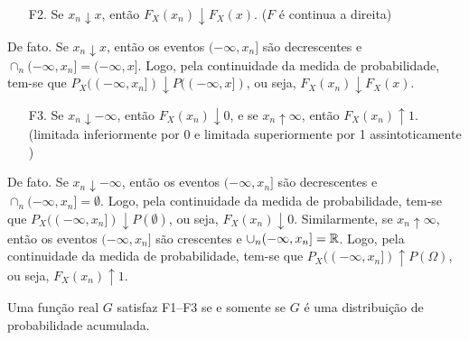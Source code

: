 \begin{frame}
\begin{block}{}

\begin{enumerate}
\item[F2.] Se $x_n\downarrow x$, então $F_X(x_n)\downarrow F_X(x)$. ($F$ é continua a direita)
\end{enumerate}
De fato. Se $x_n\downarrow x$, então os eventos $(-\infty, x_n]$ são
decrescentes e $\cap_n(-\infty, x_n]=(-\infty, x]$. Logo, pela
continuidade da medida de probabilidade, tem-se que $P_X((-\infty,
x_n])\downarrow P((-\infty, x])$, ou seja, $F_X(x_n)\downarrow
F_X(x)$.
\end{block}

\begin{block}{}

\begin{enumerate}
\item[F3.] Se $x_n\downarrow -\infty$, então $F_X(x_n)\downarrow 0$, e se $x_n\uparrow \infty$, então $F_X(x_n)\uparrow 1$. (limitada inferiormente por 0 e limitada superiormente por 1 assintoticamente )
\end{enumerate}
De fato. Se $x_n\downarrow -\infty$, então os eventos $(-\infty, x_n]$ são
decrescentes e $\cap_n (-\infty, x_n]=\emptyset$. Logo, pela
continuidade da medida de probabilidade, tem-se que $P_X((-\infty,
x_n])\downarrow P(\emptyset)$, ou seja, $F_X(x_n)\downarrow 0$.
Similarmente, se $x_n\uparrow \infty$, então os eventos $(-\infty,
x_n]$ são crescentes e $\cup_n (-\infty, x_n]=\mathbb{R}$. Logo, pela
continuidade da medida de probabilidade, tem-se que $P_X((-\infty,
x_n])\uparrow P(\Omega)$, ou seja, $F_X(x_n)\uparrow 1$.

\end{block}
\begin{teo}
\label{thm:acumula}
Uma função real $G$ satisfaz F1--F3 se e somente se $G$ é uma
distribuição de probabilidade acumulada.
\end{teo}
\end{frame}

